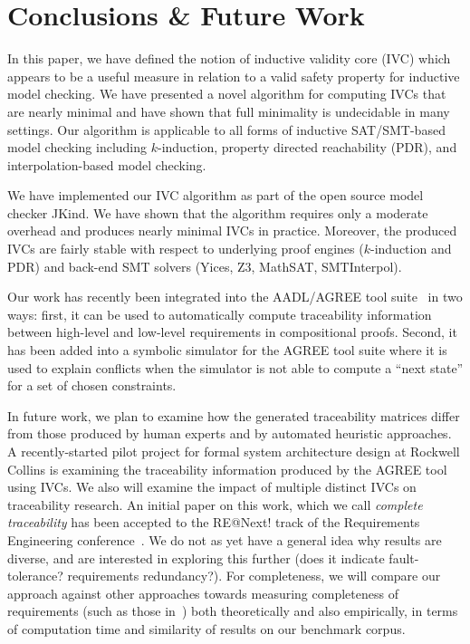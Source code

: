 \section{Conclusions \& Future Work}
\label{sec:conc}

In this paper, we have defined the notion of inductive validity core (IVC) which
appears to be a useful measure in relation to a valid safety property
for inductive model checking. We have presented a novel algorithm for
computing IVCs that are nearly minimal and have shown that full
minimality is undecidable in many settings. Our algorithm is
applicable to all forms of inductive SAT/SMT-based model checking
including $k$-induction, property directed reachability (PDR), and
interpolation-based model checking.

We have implemented our IVC algorithm as part of the open source model
checker JKind. We have shown that the algorithm requires only a
moderate overhead and produces nearly minimal IVCs in practice.
Moreover, the produced IVCs are fairly stable with respect to
underlying proof engines ($k$-induction and PDR) and back-end SMT
solvers (Yices, Z3, MathSAT, SMTInterpol).

Our work has recently been integrated into the AADL/AGREE tool
suite~\cite{QFCS15:backes,hilt2013} in two ways: first, it can be used
to automatically compute traceability information between high-level
and low-level requirements in compositional proofs. Second, it has
been added into a symbolic simulator for the AGREE tool suite where it
is used to explain conflicts when the simulator is not able to compute
a ``next state'' for a set of chosen constraints.

In future work, we plan to examine how the generated traceability matrices differ from those produced by human experts and by automated heuristic approaches.  A recently-started pilot project for formal system architecture design at Rockwell Collins is examining the traceability information produced by the AGREE tool using IVCs.  We also will examine the impact of multiple distinct IVCs on traceability research.  An initial paper on this work, which we call {\em complete traceability} has been accepted to the RE@Next! track of the Requirements Engineering conference~\cite{Murugesan16:renext}.  We do not as yet have a general idea why results are diverse, and are interested in exploring this further (does it indicate fault-tolerance? requirements redundancy?).  For completeness, we will compare our approach against other approaches towards measuring completeness of requirements (such as those in~\cite{chockler_coverage_2003, Kupferman:2006:SCF, kupferman_theory_2008}) both theoretically and also empirically, in terms of computation time and similarity of results on our benchmark corpus.

